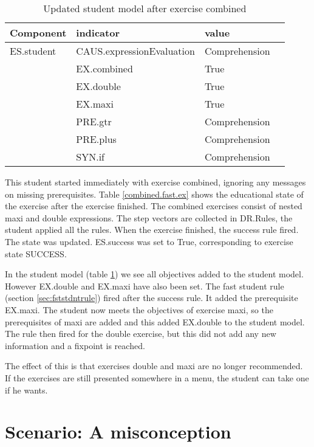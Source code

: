 \begin{table}[H]
\begin{tabular}{| l | l | l | l}
\hline
Component & indicator & value\\
\hline
ES.student & CAUS.expressionEvaluation & Comprehension\\
 &  EX.combined&  True \\
 &  EX.double & True  \\
 & EX.maxi &  True \\
 & PRE.gtr &  Comprehension \\
 & PRE.plus & Comprehension  \\
 & SYN.if &  Comprehension \\
\hline
\end{tabular}
\caption{Updated student model after exercise combined}
\label{combined.fast.student}
\end{table}

This student started immediately with exercise combined, ignoring any messages on missing prerequisites.
Table \ref{combined.fast.ex} shows the educational state of the exercise after the exercise finished.
The combined exercises consist of nested maxi and double expressions.
The step vectors are collected in DR.Rules, the student applied all the rules.
When the exercise finished, the success rule fired.
The state was updated. ES.success was set to True, corresponding to exercise state SUCCESS.

In the student model (table \ref{combined.fast.student}) we see all objectives added to the student model.
However EX.double and EX.maxi have also been set.
The fast student rule (section \ref{sec:fststdntrule}) fired after the success rule. It added the prerequisite EX.maxi.
The student now meets the objectives of exercise maxi, so the prerequisites of maxi are added and this added EX.double to the student model.
The rule then fired for the double exercise, but this did not add any new information and a fixpoint is reached.

The effect of this is that exercises double and maxi are no longer recommended.
If the exercises are still presented somewhere in a menu, the student can take one if he wants.



\section{Scenario: A misconception}

